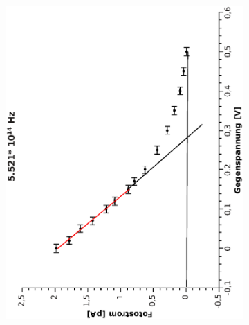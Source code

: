 \documentclass{article}
\begin{document}
\begin{figure}
\begin{subfigure}{0.45\textwidth}
\includegraphics[width=\textwidth, angle=-90]{5521.eps}
\end{subfigure}
\begin{subfigure}{0.45\textwidth}

\end{subfigure}
\end{figure}
\end{document}
